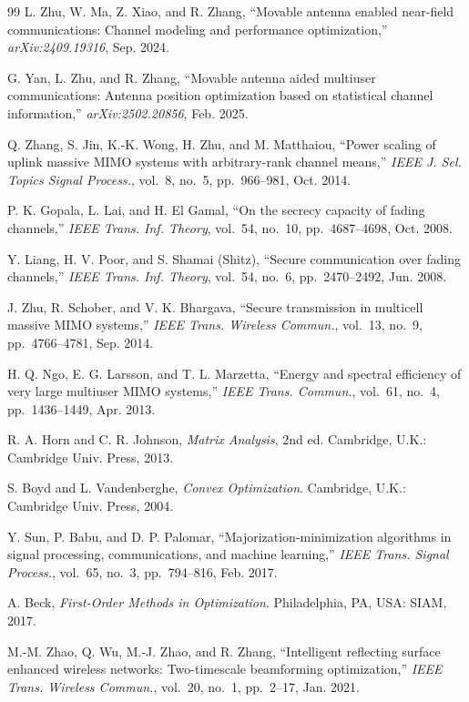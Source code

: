 \documentclass[journal]{IEEEtran}
\begin{document}
\begin{thebibliography}{99}
L. Zhu, W. Ma, Z. Xiao, and R. Zhang, ``Movable antenna enabled near-field communications: Channel modeling and performance optimization,'' \emph{arXiv:2409.19316}, Sep. 2024.

G. Yan, L. Zhu, and R. Zhang, ``Movable antenna aided multiuser communications: Antenna position optimization based on statistical channel information,'' \emph{arXiv:2502.20856}, Feb. 2025.

Q. Zhang, S. Jin, K.-K. Wong, H. Zhu, and M. Matthaiou, ``Power scaling of uplink massive MIMO systems with arbitrary-rank channel means,'' \emph{IEEE J. Sel. Topics Signal Process.}, vol.~8, no.~5, pp.~966--981, Oct. 2014.

P. K. Gopala, L. Lai, and H. El Gamal, ``On the secrecy capacity of fading channels,'' \emph{IEEE Trans. Inf. Theory}, vol.~54, no.~10, pp.~4687--4698, Oct. 2008.

Y. Liang, H. V. Poor, and S. Shamai (Shitz), ``Secure communication over fading channels,'' \emph{IEEE Trans. Inf. Theory}, vol.~54, no.~6, pp.~2470--2492, Jun. 2008.

J. Zhu, R. Schober, and V. K. Bhargava, ``Secure transmission in multicell massive MIMO systems,'' \emph{IEEE Trans. Wireless Commun.}, vol.~13, no.~9, pp.~4766--4781, Sep. 2014.

H. Q. Ngo, E. G. Larsson, and T. L. Marzetta, ``Energy and spectral efficiency of very large multiuser MIMO systems,'' \emph{IEEE Trans. Commun.}, vol.~61, no.~4, pp.~1436--1449, Apr. 2013.

R. A. Horn and C. R. Johnson, \emph{Matrix Analysis}, 2nd ed. Cambridge, U.K.: Cambridge Univ. Press, 2013.

S. Boyd and L. Vandenberghe, \emph{Convex Optimization}. Cambridge, U.K.: Cambridge Univ. Press, 2004.

Y. Sun, P. Babu, and D. P. Palomar, ``Majorization-minimization algorithms in signal processing, communications, and machine learning,'' \emph{IEEE Trans. Signal Process.}, vol.~65, no.~3, pp.~794--816, Feb. 2017.

A. Beck, \emph{First-Order Methods in Optimization}. Philadelphia, PA, USA: SIAM, 2017.

M.-M. Zhao, Q. Wu, M.-J. Zhao, and R. Zhang, ``Intelligent reflecting surface enhanced wireless networks: Two-timescale beamforming optimization,'' \emph{IEEE Trans. Wireless Commun.}, vol.~20, no.~1, pp.~2--17, Jan. 2021.

\end{thebibliography}
\end{document}
